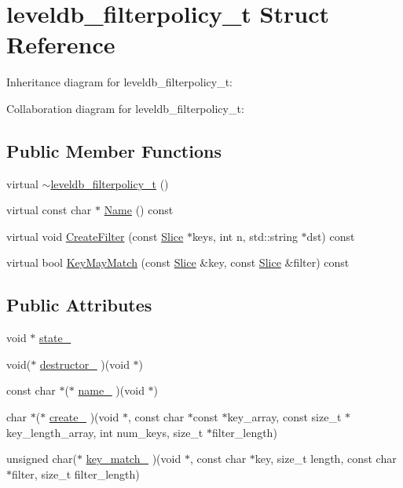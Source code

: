\hypertarget{structleveldb__filterpolicy__t}{\section{leveldb\-\_\-filterpolicy\-\_\-t Struct Reference}
\label{structleveldb__filterpolicy__t}
}


Inheritance diagram for leveldb\-\_\-filterpolicy\-\_\-t\-:


Collaboration diagram for leveldb\-\_\-filterpolicy\-\_\-t\-:
\subsection*{Public Member Functions}
\begin{DoxyCompactItemize}
\item 
virtual \hyperlink{structleveldb__filterpolicy__t_afea40a87cf4123be464f22d021dec9f3}{$\sim$leveldb\-\_\-filterpolicy\-\_\-t} ()
\item 
virtual const char $\ast$ \hyperlink{structleveldb__filterpolicy__t_a2d2e4bed02de91075ce921005c851a3e}{Name} () const 
\item 
virtual void \hyperlink{structleveldb__filterpolicy__t_a8b5b77b6a8d1c526905c7eb57d78558b}{Create\-Filter} (const \hyperlink{classleveldb_1_1_slice}{Slice} $\ast$keys, int n, std\-::string $\ast$dst) const 
\item 
virtual bool \hyperlink{structleveldb__filterpolicy__t_aa3006a26cac563bb5115d27d83b6865f}{Key\-May\-Match} (const \hyperlink{classleveldb_1_1_slice}{Slice} \&key, const \hyperlink{classleveldb_1_1_slice}{Slice} \&filter) const 
\end{DoxyCompactItemize}
\subsection*{Public Attributes}
\begin{DoxyCompactItemize}
\item 
void $\ast$ \hyperlink{structleveldb__filterpolicy__t_a35aa5dd2f350f6eafa4ae904e55dcbe2}{state\-\_\-}
\item 
void($\ast$ \hyperlink{structleveldb__filterpolicy__t_a4d73739bd834e5c7364a91e1a0a377ed}{destructor\-\_\-} )(void $\ast$)
\item 
const char $\ast$($\ast$ \hyperlink{structleveldb__filterpolicy__t_a931dfc74b3cb6cb91c1aca19ac523661}{name\-\_\-} )(void $\ast$)
\item 
char $\ast$($\ast$ \hyperlink{structleveldb__filterpolicy__t_a7135a30801b44a977db41404df3a11c1}{create\-\_\-} )(void $\ast$, const char $\ast$const $\ast$key\-\_\-array, const size\-\_\-t $\ast$key\-\_\-length\-\_\-array, int num\-\_\-keys, size\-\_\-t $\ast$filter\-\_\-length)
\item 
unsigned char($\ast$ \hyperlink{structleveldb__filterpolicy__t_a78bd1d4fbf62e505b921bb0e1bcf38f1}{key\-\_\-match\-\_\-} )(void $\ast$, const char $\ast$key, size\-\_\-t length, const char $\ast$filter, size\-\_\-t filter\-\_\-length)
\end{DoxyCompactItemize}


